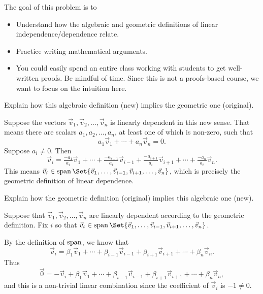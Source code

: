 \documentclass{problemset}
\begin{document}
	\question
	\begin{annotation}
		\begin{goals}

			The goal of this problem is to
			\begin{itemize}
				\item Understand how the algebraic and geometric definitions of linear
					independence/dependence relate.
				\item Practice writing mathematical arguments.
			\end{itemize}
		\end{goals}

		\begin{notes}
			\begin{itemize}
				\item You could easily spend an entire class working with students
					to get well-written proofs. Be mindful of time. Since
					this is not a proofs-based course, we want to focus on the intuition here.
			\end{itemize}
		\end{notes}
	\end{annotation}
	\begin{parts}
		\item Explain how this algebraic definition (new) implies the geometric one (original).
			\begin{solution}
				Suppose the vectors $\vec v_1, \vec v_2, \dots, \vec v_n$ is
				linearly dependent in this new sense. That means there are
				scalars	$a_1, a_2, \dots, a_n$, at least one of which is non-zero,
				such that
				\[
					a_1 \vec v_1 + \cdots + a_n \vec v_n = 0.
				\]
				Suppose $a_i\neq 0$. Then
				\[
					\vec v_i = \tfrac{-a_1}{a_i}\vec v_1+\cdots +\tfrac{-a_{i-1}}{a_i}\vec v_{i-1}
					+\tfrac{-a_{i+1}}{a_i}\vec v_{i+1}+\cdots+\tfrac{-a_n}{a_i}\vec v_n.
				\]
				This means $\vec v_i\in \Span\Set{\vec v_1,\ldots,\vec v_{i-1},\vec v_{i+1},\ldots,\vec v_n}$,
				which is precisely the geometric definition of linear dependence.
			\end{solution}
		\item Explain how the geometric definition (original) implies this algebraic one (new).
			\begin{solution}
				Suppose that $\vec v_1, \vec v_2, \dots, \vec v_n$ are linearly
				dependent according to the geometric definition. Fix $i$ so that
				$\vec v_i\in \Span\Set{\vec v_1,\ldots,\vec v_{i-1},\vec v_{i+1},\ldots,\vec v_n}$.

				By the definition of $\operatorname{span}$, we know that
				\[
					\vec v_i=\beta_1\vec v_1+\cdots +\beta_{i-1}\vec v_{i-1}+\beta_{i+1}\vec v_{i+1}
					+\cdots +\beta_n\vec v_{n}.
				\]
				Thus
				\[
					\vec 0 = -\vec v_i+\beta_1\vec v_1+\cdots +\beta_{i-1}\vec v_{i-1}+\beta_{i+1}\vec v_{i+1}
					+\cdots +\beta_n\vec v_{n},
				\]
				and this is a non-trivial linear combination since the coefficient of $\vec v_i$ is $-1\neq 0$.
			\end{solution}
	\end{parts}
\end{document}
